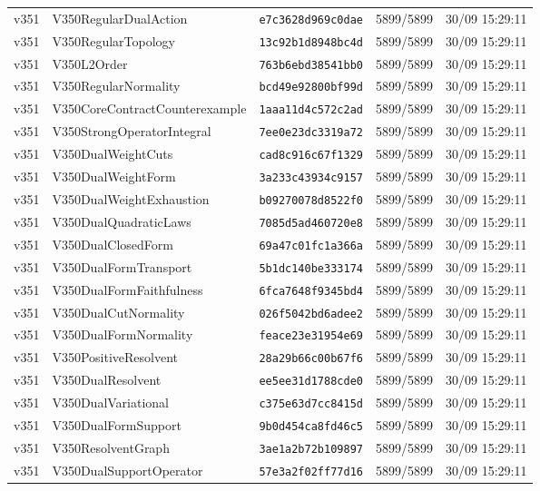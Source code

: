 \documentclass[11pt]{article}
\theoremstyle{definition}\newtheorem{deriv}{Derivation}
\begin{document}
{\begin{longtable}{@{}lllll@{}}
v351 & V350RegularDualAction & \texttt{e7c3628d969c0dae} & 5899/5899 & 30/09 15:29:11 \\
v351 & V350RegularTopology & \texttt{13c92b1d8948bc4d} & 5899/5899 & 30/09 15:29:11 \\
v351 & V350L2Order & \texttt{763b6ebd38541bb0} & 5899/5899 & 30/09 15:29:11 \\
v351 & V350RegularNormality & \texttt{bcd49e92800bf99d} & 5899/5899 & 30/09 15:29:11 \\
v351 & V350CoreContractCounterexample & \texttt{1aaa11d4c572c2ad} & 5899/5899 & 30/09 15:29:11 \\
v351 & V350StrongOperatorIntegral & \texttt{7ee0e23dc3319a72} & 5899/5899 & 30/09 15:29:11 \\
v351 & V350DualWeightCuts & \texttt{cad8c916c67f1329} & 5899/5899 & 30/09 15:29:11 \\
v351 & V350DualWeightForm & \texttt{3a233c43934c9157} & 5899/5899 & 30/09 15:29:11 \\
v351 & V350DualWeightExhaustion & \texttt{b09270078d8522f0} & 5899/5899 & 30/09 15:29:11 \\
v351 & V350DualQuadraticLaws & \texttt{7085d5ad460720e8} & 5899/5899 & 30/09 15:29:11 \\
v351 & V350DualClosedForm & \texttt{69a47c01fc1a366a} & 5899/5899 & 30/09 15:29:11 \\
v351 & V350DualFormTransport & \texttt{5b1dc140be333174} & 5899/5899 & 30/09 15:29:11 \\
v351 & V350DualFormFaithfulness & \texttt{6fca7648f9345bd4} & 5899/5899 & 30/09 15:29:11 \\
v351 & V350DualCutNormality & \texttt{026f5042bd6adee2} & 5899/5899 & 30/09 15:29:11 \\
v351 & V350DualFormNormality & \texttt{feace23e31954e69} & 5899/5899 & 30/09 15:29:11 \\
v351 & V350PositiveResolvent & \texttt{28a29b66c00b67f6} & 5899/5899 & 30/09 15:29:11 \\
v351 & V350DualResolvent & \texttt{ee5ee31d1788cde0} & 5899/5899 & 30/09 15:29:11 \\
v351 & V350DualVariational & \texttt{c375e63d7cc8415d} & 5899/5899 & 30/09 15:29:11 \\
v351 & V350DualFormSupport & \texttt{9b0d454ca8fd46c5} & 5899/5899 & 30/09 15:29:11 \\
v351 & V350ResolventGraph & \texttt{3ae1a2b72b109897} & 5899/5899 & 30/09 15:29:11 \\
v351 & V350DualSupportOperator & \texttt{57e3a2f02ff77d16} & 5899/5899 & 30/09 15:29:11 \\

\end{longtable}}
\end{document}

